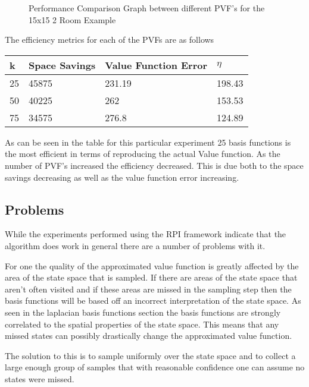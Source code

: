 \documentclass[12pt, letterpaper, final]{report}
\begin{document}
\FloatBarrier
\begin{figure}[h!]
\centering
\caption{Performance Comparison Graph between different PVF's for the
  15x15 2 Room Example}
\label{performanceComparisonGraph1}
\end{figure}
\FloatBarrier

The efficiency metrics for each of the PVFs are as follows

\FloatBarrier
\begin{table}[h!]
  \begin{tabular}{|l|l|l|l|}
  \hline
  {\bf k} & {\bf Space Savings} & {\bf Value Function Error} & $\eta$\\ \hline
  25 & 45875 & 231.19 & 198.43 \\ \hline
  50 & 40225 & 262  & 153.53 \\ \hline
  75 & 34575 &  276.8 & 124.89 \\ \hline
\end{tabular}
\end{table}
\FloatBarrier

As can be seen in the table for this particular experiment 25 basis
functions is the most efficient in terms of reproducing the actual
Value function. As the number of PVF's increased the efficiency
decreased. This is due both to the space savings decreasing as well as
the value function error increasing.

\subsection*{Problems}

While the experiments performed using the RPI framework indicate that
the algorithm does work in general there are a number of problems with
it.

For one the quality of the approximated value function is greatly
affected by the area of the state space that is sampled. If there are
areas of the state space that aren't often visited and if these areas
are missed in the sampling step then the basis functions will be based
off an incorrect interpretation of the state space. As seen in the
laplacian basis functions section the basis functions are strongly
correlated to the spatial properties of the state space. This means
that any missed states can possibly drastically change the
approximated value function.

The solution to this is to sample uniformly over the state space and
to collect a large enough group of samples that with reasonable
confidence one can assume no states were missed.
\end{document}
